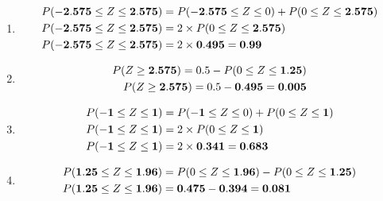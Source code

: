 \documentclass[a4paper, leqno, 12pt]{report}
\newenvironment{top_enumerate}{
\begin{enumerate}
  \setlength{\itemsep}{2em}
  \setlength{\topsep}{-0pt}
  \setlength{\partopsep}{-0pt}
}{\end{enumerate}}
\begin{document}
\begin{top_enumerate}
\setcounter{equation}{0}  %
\begin{enumerate}
	\setlength{\topsep}{-0pt}
	\setlength{\partopsep}{-0pt}
	\setlength{\itemsep}{10pt}
			\item \[
	\begin{aligned}
	P({\bf -2.575} \le Z \le {\bf 2.575}) & = P({\bf -2.575} \le Z \le 0 ) + P( 0 \le Z \le {\bf 2.575})\\
	P({\bf -2.575} \le Z \le {\bf 2.575}) & = 2 \times P( 0 \le Z \le {\bf 2.575})\\
	P({\bf -2.575} \le Z \le {\bf 2.575}) & = 2 \times {\bf 0.495} = {\bf 0.99}\\
	\end{aligned}
	\]
	 \quad \textbf{}
		\item \[
	\begin{aligned}
	P(Z \ge {\bf 2.575}) = 0.5 - P( 0 \le Z \le {\bf 1.25})\\
	P(Z \ge {\bf 2.575}) = 0.5 - {\bf 0.495} = {\bf 0.005} \\
	\end{aligned}
	\]
	 \quad \textbf{}
		\item \[
	\begin{aligned}
	P({\bf -1} \le Z \le {\bf 1}) & = P({\bf -1} \le Z \le 0 ) + P( 0 \le Z \le {\bf 1})\\
	P({\bf -1} \le Z \le {\bf 1}) & = 2 \times P( 0 \le Z \le {\bf 1})\\
	P({\bf -1} \le Z \le {\bf 1}) & = 2 \times {\bf 0.341} = {\bf 0.683}\\
	\end{aligned}
	\]
	 \quad \textbf{}
		\item \[
	\begin{aligned}
	P({\bf 1.25} \le Z \le {\bf 1.96}) & = P( 0 \le Z \le {\bf 1.96}) - P( 0 \le Z \le {\bf 1.25})\\
	P({\bf 1.25} \le Z \le {\bf 1.96}) & = {\bf 0.475} - {\bf 0.394} = {\bf 0.081}\\
	\end{aligned}
	\]
	 \quad \textbf{}
\end{enumerate}\newpage
\end{top_enumerate}


\end{document}
